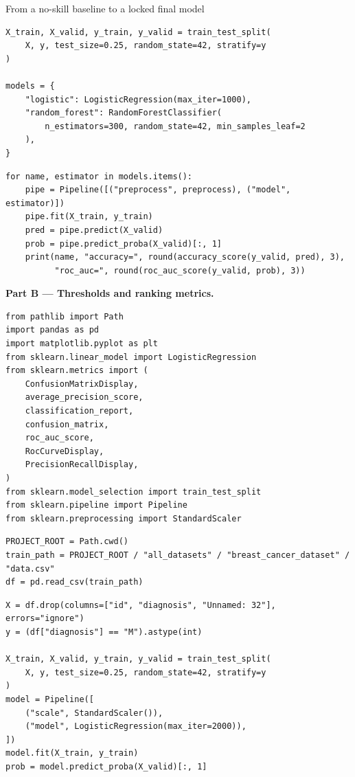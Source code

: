 \begin{labproject}{From a no-skill baseline to a locked final model}
\begin{lstlisting}[style=mlpython]
X_train, X_valid, y_train, y_valid = train_test_split(
    X, y, test_size=0.25, random_state=42, stratify=y
)

models = {
    "logistic": LogisticRegression(max_iter=1000),
    "random_forest": RandomForestClassifier(
        n_estimators=300, random_state=42, min_samples_leaf=2
    ),
}
\end{lstlisting}

\begin{lstlisting}[style=mlpython]
for name, estimator in models.items():
    pipe = Pipeline([("preprocess", preprocess), ("model", estimator)])
    pipe.fit(X_train, y_train)
    pred = pipe.predict(X_valid)
    prob = pipe.predict_proba(X_valid)[:, 1]
    print(name, "accuracy=", round(accuracy_score(y_valid, pred), 3),
          "roc_auc=", round(roc_auc_score(y_valid, prob), 3))
\end{lstlisting}

\medskip\noindent\textbf{Part B --- Thresholds and ranking metrics.}\par
\begin{lstlisting}[style=mlpython]
from pathlib import Path
import pandas as pd
import matplotlib.pyplot as plt
from sklearn.linear_model import LogisticRegression
from sklearn.metrics import (
    ConfusionMatrixDisplay,
    average_precision_score,
    classification_report,
    confusion_matrix,
    roc_auc_score,
    RocCurveDisplay,
    PrecisionRecallDisplay,
)
from sklearn.model_selection import train_test_split
from sklearn.pipeline import Pipeline
from sklearn.preprocessing import StandardScaler
\end{lstlisting}

\begin{lstlisting}[style=mlpython]
PROJECT_ROOT = Path.cwd()
train_path = PROJECT_ROOT / "all_datasets" / "breast_cancer_dataset" / "data.csv"
df = pd.read_csv(train_path)
\end{lstlisting}

\begin{lstlisting}[style=mlpython]
X = df.drop(columns=["id", "diagnosis", "Unnamed: 32"], errors="ignore")
y = (df["diagnosis"] == "M").astype(int)

X_train, X_valid, y_train, y_valid = train_test_split(
    X, y, test_size=0.25, random_state=42, stratify=y
)
model = Pipeline([
    ("scale", StandardScaler()),
    ("model", LogisticRegression(max_iter=2000)),
])
model.fit(X_train, y_train)
prob = model.predict_proba(X_valid)[:, 1]
\end{lstlisting}


\end{labproject}
